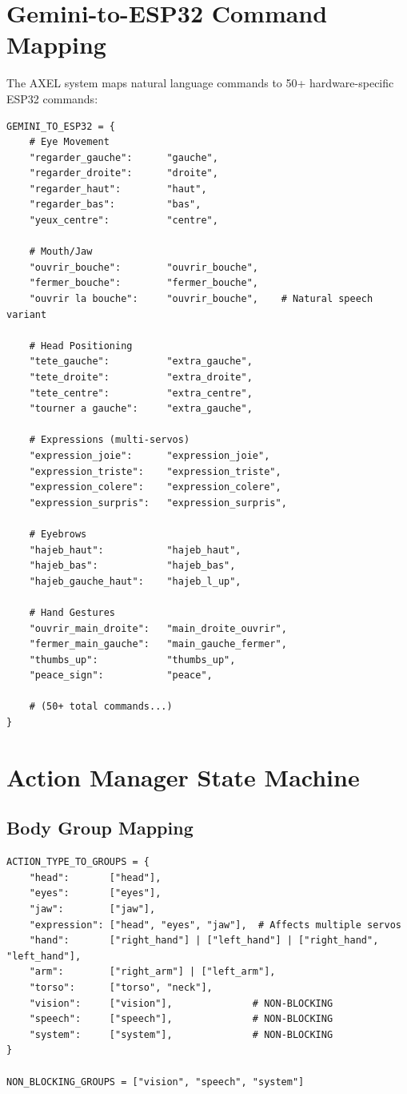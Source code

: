 \documentclass{article}
\begin{document}
\section{Gemini-to-ESP32 Command Mapping}

The AXEL system maps natural language commands to 50+ hardware-specific ESP32 commands:

\begin{lstlisting}
GEMINI_TO_ESP32 = {
    # Eye Movement
    "regarder_gauche":      "gauche",
    "regarder_droite":      "droite",
    "regarder_haut":        "haut",
    "regarder_bas":         "bas",
    "yeux_centre":          "centre",
    
    # Mouth/Jaw
    "ouvrir_bouche":        "ouvrir_bouche",
    "fermer_bouche":        "fermer_bouche",
    "ouvrir la bouche":     "ouvrir_bouche",    # Natural speech variant
    
    # Head Positioning
    "tete_gauche":          "extra_gauche",
    "tete_droite":          "extra_droite",
    "tete_centre":          "extra_centre",
    "tourner a gauche":     "extra_gauche",
    
    # Expressions (multi-servos)
    "expression_joie":      "expression_joie",
    "expression_triste":    "expression_triste",
    "expression_colere":    "expression_colere",
    "expression_surpris":   "expression_surpris",
    
    # Eyebrows
    "hajeb_haut":           "hajeb_haut",
    "hajeb_bas":            "hajeb_bas",
    "hajeb_gauche_haut":    "hajeb_l_up",
    
    # Hand Gestures
    "ouvrir_main_droite":   "main_droite_ouvrir",
    "fermer_main_gauche":   "main_gauche_fermer",
    "thumbs_up":            "thumbs_up",
    "peace_sign":           "peace",
    
    # (50+ total commands...)
}
\end{lstlisting}

\section{Action Manager State Machine}

\subsection{Body Group Mapping}

\begin{lstlisting}
ACTION_TYPE_TO_GROUPS = {
    "head":       ["head"],
    "eyes":       ["eyes"],
    "jaw":        ["jaw"],
    "expression": ["head", "eyes", "jaw"],  # Affects multiple servos
    "hand":       ["right_hand"] | ["left_hand"] | ["right_hand", "left_hand"],
    "arm":        ["right_arm"] | ["left_arm"],
    "torso":      ["torso", "neck"],
    "vision":     ["vision"],              # NON-BLOCKING
    "speech":     ["speech"],              # NON-BLOCKING
    "system":     ["system"],              # NON-BLOCKING
}

NON_BLOCKING_GROUPS = ["vision", "speech", "system"]
\end{lstlisting}
\end{document}
